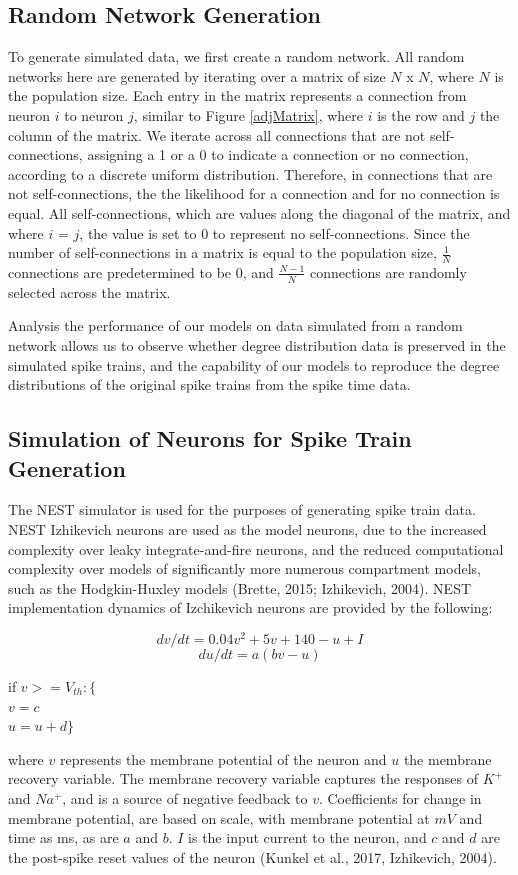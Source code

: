 \documentclass[11pt,titlepage]{article}
\begin{document}
\subsection{Random Network Generation}
To generate simulated data, we first create a random network. All random networks here are generated by iterating over a matrix of size $N$ x $N$, where $N$ is the population size. Each entry in the matrix represents a connection from neuron $i$ to neuron $j$, similar to Figure \ref{adjMatrix}, where $i$ is the row and $j$ the column of the matrix. We iterate across all connections that are not self-connections, assigning a 1 or a 0 to indicate a connection or no connection, according to a discrete uniform distribution. Therefore, in connections that are not self-connections, the the likelihood for a connection and for no connection is equal. All self-connections, which are values along the diagonal of the matrix, and where $i$ = $j$, the value is set to 0 to represent no self-connections. Since the number of self-connections in a matrix is equal to the population size, $\frac{1}{N}$ connections are predetermined to be 0, and $\frac{N-1}{N}$ connections are randomly selected across the matrix.\par
Analysis the performance of our models on data simulated from a random network allows us to observe whether degree distribution data is preserved in the simulated spike trains, and the capability of our models to reproduce the degree distributions of the original spike trains from the spike time data.\par

\subsection{Simulation of Neurons for Spike Train Generation}
The NEST simulator is used for the purposes of generating spike train data. NEST Izhikevich neurons are used as the model neurons, due to the increased complexity over leaky integrate-and-fire neurons, and the reduced computational complexity over models of significantly more numerous compartment models, such as the Hodgkin-Huxley models (Brette, 2015; Izhikevich, 2004). NEST implementation dynamics of Izchikevich neurons are provided by the following:

$$dv/dt=0.04v^2+5v+140-u+I$$
$$du/dt=a(bv-u)$$
\smallskip

{\centering
if $v >= V_{th}:\{$\\
$v = c$\\
$u = u + d\}$\par
}
where $v$ represents the membrane potential of the neuron and $u$ the membrane recovery variable. The membrane recovery variable captures the responses of $K^{+}$ and $Na^{+}$, and is a source of negative feedback to $v$. Coefficients for change in membrane potential, are based on scale, with membrane potential at $mV$ and time as ms, as are $a$ and $b$. $I$ is the input current to the neuron, and $c$ and $d$ are the post-spike reset values of the neuron (Kunkel et al., 2017, Izhikevich, 2004). 
\end{document}
